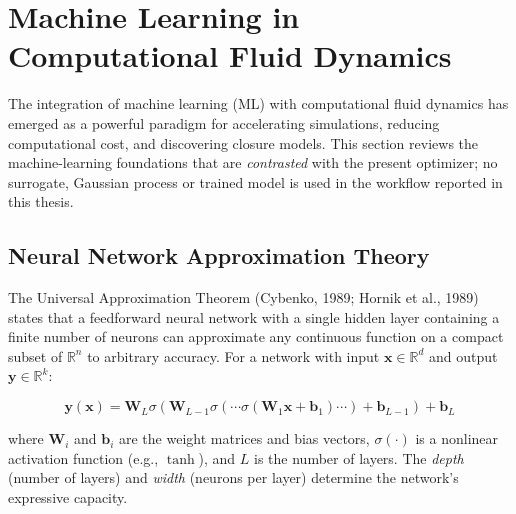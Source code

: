 \section{Machine Learning in Computational Fluid Dynamics}

The integration of machine learning (ML) with computational fluid dynamics has emerged as a powerful paradigm for accelerating simulations, reducing computational cost, and discovering closure models. This section reviews the machine-learning foundations that are \emph{contrasted} with the present optimizer; no surrogate, Gaussian process or trained model is used in the workflow reported in this thesis.

\subsection{Neural Network Approximation Theory}

The Universal Approximation Theorem (Cybenko, 1989; Hornik et al., 1989) states that a feedforward neural network with a single hidden layer containing a finite number of neurons can approximate any continuous function on a compact subset of $\mathbb{R}^n$ to arbitrary accuracy. For a network with input $\mathbf{x} \in \mathbb{R}^d$ and output $\mathbf{y} \in \mathbb{R}^k$:

\begin{equation}
    \mathbf{y}(\mathbf{x}) = \mathbf{W}_L \sigma(\mathbf{W}_{L-1} \sigma(\cdots \sigma(\mathbf{W}_1 \mathbf{x} + \mathbf{b}_1) \cdots) + \mathbf{b}_{L-1}) + \mathbf{b}_L
    \label{eq:neural_network}
\end{equation}

\noindent where $\mathbf{W}_i$ and $\mathbf{b}_i$ are the weight matrices and bias vectors, $\sigma(\cdot)$ is a nonlinear activation function (e.g., $\tanh$), and $L$ is the number of layers. The \textit{depth} (number of layers) and \textit{width} (neurons per layer) determine the network's expressive capacity.


